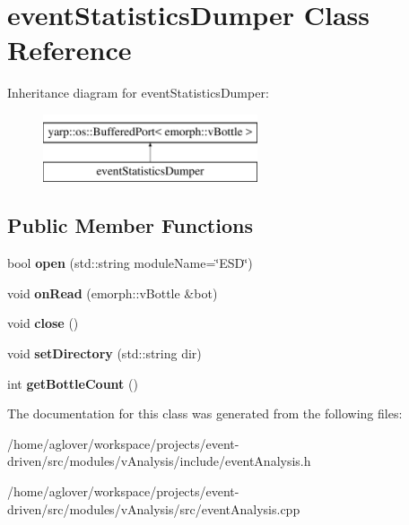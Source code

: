 \hypertarget{classeventStatisticsDumper}{}\section{event\+Statistics\+Dumper Class Reference}
\label{classeventStatisticsDumper}
Inheritance diagram for event\+Statistics\+Dumper\+:\begin{figure}[H]
\begin{center}
\leavevmode
\includegraphics[height=2.000000cm]{classeventStatisticsDumper}
\end{center}
\end{figure}
\subsection*{Public Member Functions}
\begin{DoxyCompactItemize}
\item 
bool {\bfseries open} (std\+::string module\+Name=\char`\"{}E\+SD\char`\"{})\hypertarget{classeventStatisticsDumper_ae19ee350a1d131d0c54e0f7ac2437397}{}\label{classeventStatisticsDumper_ae19ee350a1d131d0c54e0f7ac2437397}

\item 
void {\bfseries on\+Read} (emorph\+::v\+Bottle \&bot)\hypertarget{classeventStatisticsDumper_a5373c7abee32f595308f59c3d2c02c01}{}\label{classeventStatisticsDumper_a5373c7abee32f595308f59c3d2c02c01}

\item 
void {\bfseries close} ()\hypertarget{classeventStatisticsDumper_aea5b77b83db3a9955e8fd8322d91dea1}{}\label{classeventStatisticsDumper_aea5b77b83db3a9955e8fd8322d91dea1}

\item 
void {\bfseries set\+Directory} (std\+::string dir)\hypertarget{classeventStatisticsDumper_a48c32b38d277f6b735c78cfbad6bcb64}{}\label{classeventStatisticsDumper_a48c32b38d277f6b735c78cfbad6bcb64}

\item 
int {\bfseries get\+Bottle\+Count} ()\hypertarget{classeventStatisticsDumper_af593efeee949a19d018aea33cbc5281a}{}\label{classeventStatisticsDumper_af593efeee949a19d018aea33cbc5281a}

\end{DoxyCompactItemize}


The documentation for this class was generated from the following files\+:\begin{DoxyCompactItemize}
\item 
/home/aglover/workspace/projects/event-\/driven/src/modules/v\+Analysis/include/event\+Analysis.\+h\item 
/home/aglover/workspace/projects/event-\/driven/src/modules/v\+Analysis/src/event\+Analysis.\+cpp\end{DoxyCompactItemize}
